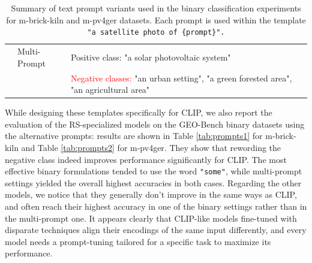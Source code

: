 \documentclass[a4paper, twoside, english]{sapthesis} %
\begin{document}
\begin{table}[H]
\begin{tabular}{llp{8cm}}
  \cmidrule(lr){2-3}
  & Multi-Prompt & \textcolor{customgreen}{Positive class:} "a solar photovoltaic system" \\
  & & \textcolor{red}{Negative classes:} "an urban setting", "a green forested area", "an agricultural area" \\
\bottomrule
\end{tabular}
\vspace{0.3cm}
\caption{\normalsize Summary of text prompt variants used in the binary classification experiments for m-brick-kiln and m-pv4ger datasets. Each prompt is used within the template \texttt{"a satellite photo of \{prompt\}".}}
\label{tab:prompt_templates}
\end{table}

While designing these templates specifically for CLIP, we also report the evaluation of the RS-specialized models on the GEO-Bench binary datasets using the alternative prompts: results are shown in Table \ref{tab:prompts1} for m-brick-kiln and Table \ref{tab:prompts2} for m-pv4ger. They show that rewording the negative class indeed improves performance significantly for CLIP. The most effective binary formulations tended to use the word \texttt{"some"}, while multi-prompt settings yielded the overall highest accuracies in both cases. Regarding the other models, we notice that they generally don't improve in the same ways as CLIP, and often reach their highest accuracy in one of the binary settings rather than in the multi-prompt one. It appears clearly that CLIP-like models fine-tuned with disparate techniques align their encodings of the same input differently, and every model needs a prompt-tuning tailored for a specific task to maximize its performance.

\vspace{0.5cm}
\end{document}
